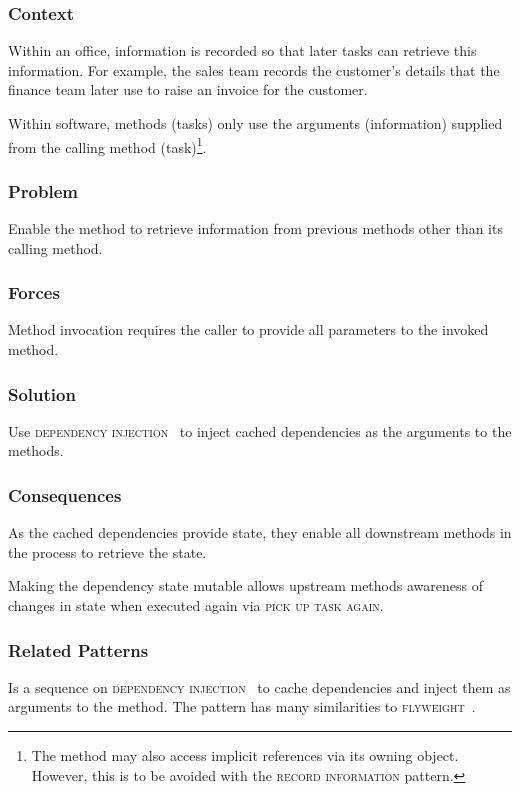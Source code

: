 \documentclass[prodmode]{style/acmlarge}
\begin{document}
\subsubsection*{Context} Within an office, information is recorded so that later
tasks can retrieve this information.  For example, the sales team records the
customer's details that the finance team later use to raise an invoice for the
customer.

Within software, methods (tasks) only use the arguments (information) supplied
from the calling method (task)\footnote{The method may also access implicit
references via its owning object.  However, this is to be avoided with the
\textsc{record information} pattern.}.

\subsubsection*{\textbf{Problem}} Enable the method to retrieve information from
previous methods other than its calling method.

\subsubsection*{Forces} Method invocation requires the caller to provide all
parameters to the invoked method.

\subsubsection*{\textbf{Solution}} Use \textsc{dependency injection}~\cite{ioc}
to inject cached dependencies as the arguments to the methods.

\subsubsection*{Consequences} As the cached dependencies provide state, they
enable all downstream methods in the process to retrieve the state.

Making the dependency state mutable allows upstream methods awareness of changes
in state when executed again via \textsc{pick up task again}.

\subsubsection*{Related Patterns} Is a sequence on \textsc{dependency
injection}~\cite{ioc} to cache dependencies and inject them as arguments to the
method.  The pattern has many similarities to \textsc{flyweight}~\cite{gof}.
\end{document}
